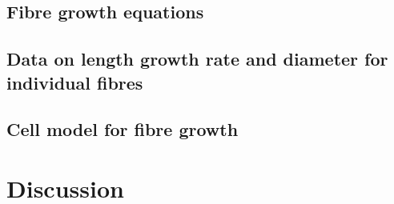 \documentclass[titlepage]{article}  %
\begin{document}
\subsection{Fibre growth equations}
\subsection{Data on length growth rate and diameter for individual fibres}
\subsection{Cell model for fibre growth}

\section{Discussion}
\end{document}
